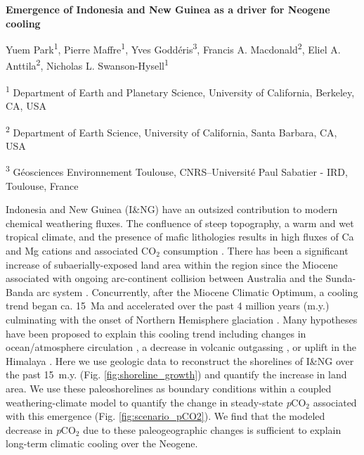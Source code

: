 \documentclass[11pt,letterpaper]{article}
\newcommand{\pCOtwo}{\textit{p}CO$_{2}$\xspace}
\newcommand{\COtwo}{CO$_{2}$\xspace}
\begin{document}
\begin{flushleft}
{\Large \textbf{Emergence of Indonesia and New Guinea as a driver for Neogene cooling}}

Yuem Park\textsuperscript{1},
Pierre Maffre\textsuperscript{1},
Yves Godd\'eris\textsuperscript{3},
Francis A. Macdonald\textsuperscript{2},
Eliel A. Anttila\textsuperscript{2},
Nicholas L. Swanson-Hysell\textsuperscript{1}

\bigskip
\textsuperscript{1} Department of Earth and Planetary Science, University of California, Berkeley, CA, USA

\textsuperscript{2} Department of Earth Science, University of California, Santa Barbara, CA, USA

\textsuperscript{3} G\'eosciences Environnement Toulouse, CNRS--Universit\'e Paul Sabatier - IRD, Toulouse, France

\bigskip

\end{flushleft}

\linenumbers

Indonesia and New Guinea (I\&NG) have an outsized contribution to modern chemical weathering fluxes. The confluence of steep topography, a warm and wet tropical climate, and the presence of mafic lithologies results in high fluxes of Ca and Mg cations and associated \COtwo consumption \cite{Gaillardet1999a, Hartmann2009a, Milliman2013a, Hartmann2014a}. There has been a significant increase of subaerially-exposed land area within the region since the Miocene associated with ongoing arc-continent collision between Australia and the Sunda-Banda arc system \cite{Molnar2015a, Hall2017a, Macdonald2019a}. Concurrently, after the Miocene Climatic Optimum, a cooling trend began ca. 15~Ma and accelerated over the past 4 million years (m.y.) culminating with the onset of Northern Hemisphere glaciation \cite{Shackleton1984a, Zachos2001a}. Many hypotheses have been proposed to explain this cooling trend including changes in ocean/atmosphere circulation \cite{Haug1998a, Shevenell2004a, Molnar2015a}, a decrease in volcanic outgassing \cite{Berner1983a}, or uplift in the Himalaya \cite{Raymo1988a}. Here we use geologic data to reconstruct the shorelines of I\&NG over the past 15~m.y. (Fig. \ref{fig:shoreline_growth}) and quantify the increase in land area. We use these paleoshorelines as boundary conditions within a coupled weathering-climate model to quantify the change in steady-state \pCOtwo associated with this emergence (Fig. \ref{fig:scenario_pCO2}). We find that the modeled decrease in \pCOtwo due to these paleogeographic changes is sufficient to explain long-term climatic cooling over the Neogene.
\end{document}
